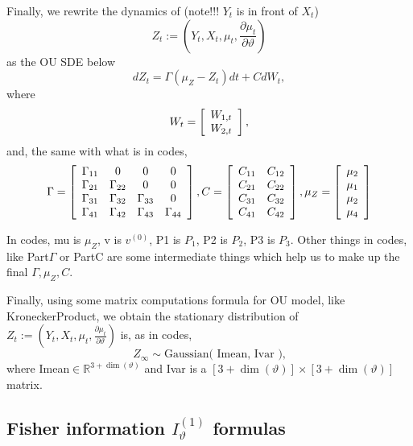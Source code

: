 \documentclass[11pt]{article}%
\theoremstyle{definition}
\begin{document}
Finally, we rewrite the dynamics of (note!!! $Y_{t}$ is in front of $X_{t}$)
\[
Z_{t}:=\left(  Y_{t},X_{t},\mu_{t},\frac{\partial\mu_{t}}{\partial\vartheta
}\right)
\]
as the OU SDE below%
\[
dZ_{t}=\Gamma(\mu_{Z}-Z_{t})dt+CdW_{t},
\]
where%
\[
W_{t}=\left[
\begin{array}
[c]{l}%
{W_{1,t}}\\
{W_{2,t}}%
\end{array}
\right]  ,
\]
and, the same with what is in codes,%
\[
\Gamma=\left[
\begin{array}
[c]{cccc}%
\Gamma_{11} & 0 & 0 & 0\\
\Gamma_{21} & \Gamma_{22} & 0 & 0\\
\Gamma_{31} & \Gamma_{32} & \Gamma_{33} & 0\\
\Gamma_{41} & \Gamma_{42} & \Gamma_{43} & \Gamma_{44}%
\end{array}
\right]  ,C=\left[
\begin{array}
[c]{cc}%
C_{11} & C_{12}\\
C_{21} & C_{22}\\
C_{31} & C_{32}\\
C_{41} & C_{42}%
\end{array}
\right]  ,\mu_{Z}=\left[
\begin{array}
[c]{c}%
\mu_{2}\\
\mu_{1}\\
\mu_{2}\\
\mu_{4}%
\end{array}
\right]
\]


In codes, mu is $\mu_{Z}$, v is $v^{\left(  0\right)  }$, P1 is $P_{1}$, P2 is
$P_{2}$, P3 is $P_{3}$. Other things in codes, like Part$\Gamma$ or PartC are
some intermediate things which help us to make up the final $\Gamma,\mu_{Z},C$.

Finally, using some matrix computations formula for OU model, like
KroneckerProduct, we obtain the stationary distribution of $Z_{t}:=\left(
Y_{t},X_{t},\mu_{t},\frac{\partial\mu_{t}}{\partial\vartheta}\right)  $ is, as
in codes,%
\[
Z_{\infty}\sim\text{Gaussian( Imean, Ivar ),}%
\]
where Imean$\in\mathbb{R}^{3+\dim(\vartheta)}$ and Ivar is a $\left[
3+\dim(\vartheta)\right]  \times\left[  3+\dim(\vartheta)\right]  $ matrix.

\subsection{Fisher information $I_{\vartheta}^{(1)}$ formulas}
\end{document}
